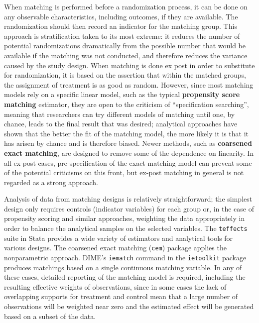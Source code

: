 When matching is performed before a randomization process,
it can be done on any observable characteristics,
including outcomes, if they are available.
The randomization should then record an indicator for the matching group.
This approach is stratification taken to its most extreme:
it reduces the number of potential randomizations dramatically
from the possible number that would be available
if the matching was not conducted,
and therefore reduces the variance caused by the study design.
When matching is done ex post in order to substitute for randomization,
it is based on the assertion that within the matched groups,
the assignment of treatment is as good as random.
However, since most matching models rely on a specific linear model,
such as the typical \textbf{propensity score matching} estimator,
they are open to the criticism of ``specification searching'',
meaning that researchers can try different models of matching
until one, by chance, leads to the final result that was desired;
analytical approaches have shown that the better the fit of the matching model,
the more likely it is that it has arisen by chance and is therefore biased.\cite{king2019propensity}
Newer methods, such as \textbf{coarsened exact matching},\cite{iacus2012causal}
are designed to remove some of the dependence on linearity.
In all ex-post cases, pre-specification of the exact matching model
can prevent some of the potential criticisms on this front,
but ex-post matching in general is not regarded as a strong approach.

Analysis of data from matching designs is relatively straightforward;
the simplest design only requires controls (indicator variables) for each group
or, in the case of propensity scoring and similar approaches,
weighting the data appropriately in order to balance the analytical samples on the selected variables.
The \texttt{teffects} suite in Stata provides a wide variety
of estimators and analytical tools for various designs.
The coarsened exact matching (\texttt{cem}) package applies the nonparametric approach.
DIME's \texttt{iematch} command in the \texttt{ietoolkit} package produces matchings based on a single continuous matching variable.
In any of these cases, detailed reporting of the matching model is required,
including the resulting effective weights of observations,
since in some cases the lack of overlapping supports for treatment and control
mean that a large number of observations will be weighted near zero
and the estimated effect will be generated based on a subset of the data.

